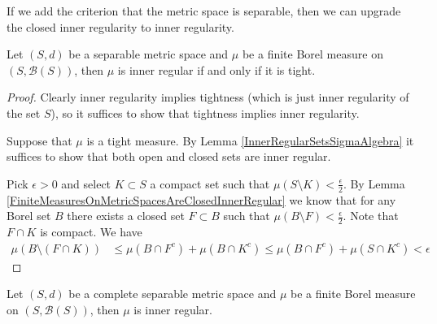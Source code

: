 If we add the criterion that the metric space is separable, then we
can upgrade the closed inner regularity to inner regularity.
\begin{lem}\label{SeparableInnerRegularTight}Let $(S,d)$ be a
  separable metric space and $\mu$ be a finite Borel measure on $(S,
\mathcal{B}(S))$, then $\mu$ is inner regular if and only if it is tight.
\end{lem}
\begin{proof}
Clearly inner regularity implies tightness (which is just inner
regularity of the set $S$), so it suffices to show
that tightness implies inner regularity.

Suppose that $\mu$ is a tight measure.  By Lemma
\ref{InnerRegularSetsSigmaAlgebra} it suffices to show that both open
and closed sets are inner regular.

Pick $\epsilon >0$ and select $K \subset S$ a compact set such that $\mu(S \setminus K) < \frac{\epsilon}{2}$.
By Lemma \ref{FiniteMeasuresOnMetricSpacesAreClosedInnerRegular} we
know that for any Borel set $B$ there exists a closed set $F \subset
B$ such that $\mu(B \setminus F) < \frac{\epsilon}{2}$.  Note that $F
\cap K$ is compact.   We have
\begin{align*}
\mu(B \setminus (F \cap K)) &\leq \mu(B \cap F^c) + \mu(B \cap K^c) \leq \mu(B \cap F^c) + \mu(S \cap K^c) < \epsilon
\end{align*}
\end{proof}
\begin{thm}\label{UlamsTheorem}Let $(S,d)$ be a
  complete separable metric space and $\mu$ be a finite Borel measure on $(S,
\mathcal{B}(S))$, then $\mu$ is inner regular.
\end{thm}
